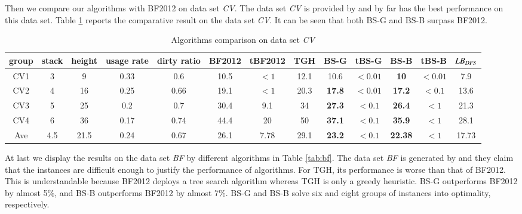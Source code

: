 \documentclass[review,3p,times,authoryear,12pt]{elsarticle}
\begin{document}
Then we compare our algorithms with BF2012 on data set {\em CV}. The data set {\em CV} is provided by \cite{Caserta2009} and by far \cite{BF2012} has the best performance on this data set. Table \ref{tab:cv} reports the comparative result on the data set {\em CV}. It can be seen that both BS-G and BS-B surpass BF2012. 
\begin{table}[htbp]
\begin{footnotesize}
  \centering
  \caption{\label{tab:cv} Algorithms comparison on data set {\em CV}}
    \begin{tabular}{c|c|c|c|c|c|c|c|c|c|c|c|c}
    \hline
    group & stack & height & usage rate & dirty ratio & BF2012 & tBF2012 & TGH   & BS-G  & tBS-G & BS-B  & tBS-B & $\id{LB}_\id{DFS}$\\
    \hline
    CV1  & 3  & 9   & 0.33 & 0.6  & 10.5 & $<1$ & 12.1 & 10.6          & $<0.01$ & \textbf{10}   & $<0.01$&7.9\\
    CV2  & 4  & 16  & 0.25 & 0.66 & 19.1 & $<1$ & 20.3 & \textbf{17.8} & $<0.01$ & \textbf{17.2} & $<0.1$ &13.6\\
    CV3  & 5  & 25  & 0.2  & 0.7  & 30.4 & 9.1  & 34   & \textbf{27.3} & $<0.1$  & \textbf{26.4} & $<1$   &21.3\\
    CV4  & 6  & 36  & 0.17 & 0.74 & 44.4 & 20   & 50   & \textbf{37.1} & $<0.1$  & \textbf{35.9} & $<1$   &28.1\\
    \hline
    Ave  & 4.5& 21.5& 0.24 & 0.67 & 26.1 & 7.78 & 29.1 & \textbf{23.2} & $<0.1$  & \textbf{22.38}& $<1$   & 17.73\\
    \hline
    \end{tabular}%
\end{footnotesize}
\end{table}%

At last we display the results on the data set {\em BF} by different algorithms in Table \ref{tab:bf}. The data set {\em BF} is generated by \cite{BF2012} and they claim that the instances are difficult enough to justify the performance of algorithms. For TGH, its performance is worse than that of BF2012. This is understandable because BF2012 deploys a tree search algorithm whereas TGH is only a greedy heuristic. BS-G outperforms BF2012 by almost 5\%, and BS-B outperforms BF2012 by almost 7\%. BS-G and BS-B solve six and eight groups of instances into optimality, respectively.
\end{document}
